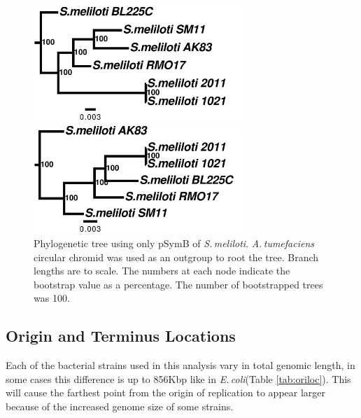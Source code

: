 \documentclass[11pt]{article}
\newcommand{\smel}{\textit{S.\,meliloti}\xspace}
\newcommand{\agro}{\textit{A.\,tumefaciens}\xspace}
\newcommand{\ecol}{\textit{E.\,coli}\xspace}
\begin{document}
		\begin{figure}
		\begin{center}
			\includegraphics[width=0.7\textwidth]{./figs/pSymA_chrom_figtree_raw_29Aug20.pdf}
			\caption{\label{fig:sinoPAtree} Phylogenetic tree using only pSymA of \smel. \agro circular plasmid was used as an outgroup to root the tree. Branch lengths are to scale. The numbers at each node indicate the bootstrap value as a percentage. The number of bootstrapped trees was 100.}
		\end{center}
		\vspace*{\floatsep}%
			\begin{center}
				
				\includegraphics[width=0.7\textwidth]{./figs/pSymB_chrom_figtree_raw_29Aug20.pdf}
				\caption{\label{fig:sinoPBtree} Phylogenetic tree using only pSymB of \smel. \agro circular chromid was used as an outgroup to root the tree. Branch lengths are to scale. The numbers at each node indicate the bootstrap value as a percentage. The number of bootstrapped trees was 100.}
			\end{center}
		\end{figure}
	

	
	\subsection{Origin and Terminus Locations}

Each of the bacterial strains used in this analysis vary in total genomic length, in some cases this difference is up to 856Kbp like in \ecol (Table \ref{tab:oriloc}). 
This will cause the farthest point from the origin of replication to appear larger because of the increased genome size of some strains.
\end{document}
